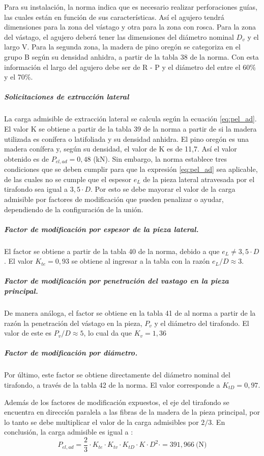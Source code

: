 Para su instalación, la norma indica que es necesario realizar perforaciones guías, las cuales están en función de sus características. Así el agujero tendrá dimensiones para la zona del vástago y otra para la zona con rosca. Para la zona del vástago, el agujero deberá tener las dimensiones del diámetro nominal $D_v$ y el largo V. Para la segunda zona, la madera de pino oregón se categoriza en el grupo B según su densidad anhidra, a partir de la tabla 38 de la norma. Con esta información el largo del agujero debe ser de R - P  y el diámetro del entre el 60\% y el 70\%.
\subparagraph{Solicitaciones de extracción lateral}
La carga admisible de extracción lateral se calcula según la ecuación \ref{eq:pel_ad}. El valor K se obtiene a partir de la tabla 39 de la norma a partir de si la madera utilizada es conífera o latifoliada y su densidad anhidra. El pino oregón es una madera conífera y, según su densidad, el valor de K es de 11,7. Así el valor obtenido es de $P_{el,ad} = 0,48$ (kN). Sin embargo, la norma establece tres condiciones que se deben cumplir para que la expresión \ref{eq:pel_ad} sea aplicable, de las cuales no se cumple que el espesor $e_L$ de la pieza lateral atravesada por el tirafondo sea igual a $3,5\cdot D$. Por esto se debe mayorar el valor de la carga admisible por factores de modificación que pueden penalizar o ayudar, dependiendo de la configuración de la unión.

\subparagraph{Factor de modificación por espesor de la pieza lateral.}
El factor se obtiene a partir de la tabla 40 de la norma, debido a que $e_L \neq 3,5\cdot D$. El valor $K_{te}=0,93$ se obtiene al ingresar a la tabla con la razón $e_L/D \approx 3$.

\subparagraph{Factor de modificación por penetración del vastago en la pieza principal.}
De manera análoga, el factor se obtiene en la tabla 41 de al norma a partir de la razón la penetración del vástago en la pieza, $P_v$ y el diámetro del tirafondo. El valor de este es $P_v/D \approx 5$, lo cual da que $K_v=1,36$

\subparagraph{Factor de modificación por diámetro.}
Por último, este factor se obtiene directamente del diámetro nominal del tirafondo, a través de la tabla 42 de la norma. El valor corresponde a $K_{tD}=0,97$.

Además de los factores de modificación expuestos, el eje del tirafondo se encuentra en dirección paralela a las fibras de la madera de la pieza principal, por lo tanto se debe multiplicar el valor de la carga admisibles por $2/3$. En conclusión, la carga admisible es igual a :
\begin{equation}
	P_{el,ad} = \frac{2}{3}\cdot K_{te}\cdot K_{tv}\cdot K_{tD} \cdot K\cdot D^2\cdot = 391,966 \: \text{(N)}
\end{equation}

